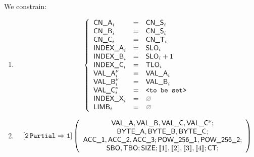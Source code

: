 \begin{center}
\end{center}

We constrain:
\begin{enumerate}
	\item 
		\[
			\left\{ \begin{array}{lclr}
				\cnA      _{i}       & = & \cnS_{i}            \\
				\cnB      _{i}       & = & \cnS_{i}            \\
				\cnC      _{i}       & = & \cnT_{i}            \\
				\indexA   _{i}       & = & \slo_{i}            \\
				\indexB   _{i}       & = & \slo_{i} + 1        \\
				\indexC   _{i}       & = & \tlo_{i}            \\
				\valA     _{i}\new{} & = & \valA_{i}           \\
				\valB     _{i}\new{} & = & \valB_{i}           \\
				\valC     _{i}\new{} & = & \valueToBeSet       \\
				\indexX   _{i}       & = & \nothing            \\
				\limb     _{i}       & = & \nothing            \\
			\end{array} \right.
		\]
	\item 
		\[
			\twoPartialToOne
			\left( \begin{array}{c}
				\valA{}, \valB{}, \valC{}, \valC{}\new{};\\
				\BYTEA{}, \BYTEB{}, \BYTEC{};\\
				\acc{1}, \acc{2}, \acc{3}; \pow{1}, \pow{2}; \\
				\sbo{}, \tbo{}; \size{}; \bit{1}, \bit{2}, \bit{3}, \bit{4}; \ct{};
			\end{array} \right)
		\]

\end{enumerate}
